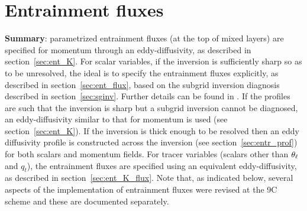 \documentclass{UMDP_article}
\begin{document}
\section{Entrainment fluxes}
\label{sec:entr}

{\bf Summary}: parametrized entrainment fluxes (at the top of mixed
layers) are specified for momentum through an eddy-diffusivity, as
described in section~\ref{sec:ent_K}.  For scalar variables, if the
inversion is sufficiently sharp so as to be unresolved, the ideal is
to specify the entrainment fluxes explicitly, as described in
section~\ref{sec:ent_flux}, based on the subgrid inversion diagnosis
described in section~\ref{sec:sginv}.  Further details can be found in
\cite{lock01}.  If the profiles are such that the inversion is sharp
but a subgrid inversion cannot be diagnosed, an eddy-diffusivity
similar to that for momentum is used (see section~\ref{sec:ent_K}).
If the inversion is thick enough to be resolved then an eddy
diffusivity profile is constructed across the inversion (see
section~\ref{sec:entr_prof}) for both scalars and momentum fields.
For tracer variables (scalars other than $\theta_{\ell}$ and $q_t$), the
entrainment fluxes are specified using an equivalent eddy-diffusivity,
as described in section~\ref{sec:ent_K_flux}.  Note that, as indicated
below, several aspects of the implementation of entrainment fluxes
were revised at the 9C scheme and these are documented separately.
\end{document}

